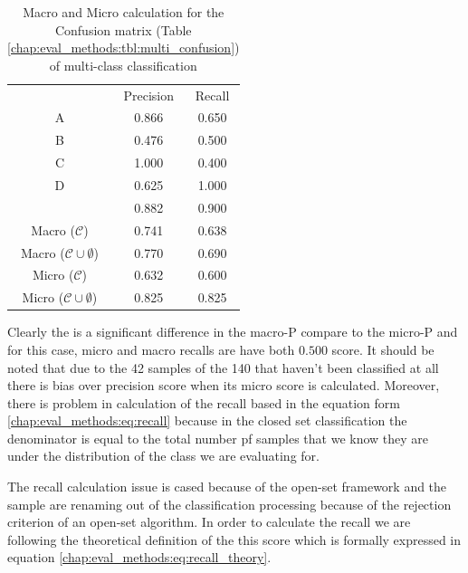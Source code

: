 \begin{table}[H][t]
	\center
	\caption{Macro and Micro calculation for the Confusion matrix (Table \ref{chap:eval_methods:tbl:multi_confusion}) of multi-class classification}\label{chap:eval_methods:tbl:macro_vs_micro}
	\begin{tabular}{l l l}
		\cline{2-3}
		& \multicolumn{1}{|c}{Precision} & \multicolumn{1}{c|}{Recall}\\
		\cline{1-3}
		\multicolumn{1}{|c}{A} & \multicolumn{1}{|c}{0.866} & \multicolumn{1}{c|}{0.650}\\
		\multicolumn{1}{|c}{B} & \multicolumn{1}{|c}{0.476} & \multicolumn{1}{c|}{0.500}\\
		\multicolumn{1}{|c}{C} & \multicolumn{1}{|c}{1.000} & \multicolumn{1}{c|}{0.400}\\
		\multicolumn{1}{|c}{D} & \multicolumn{1}{|c}{0.625} & \multicolumn{1}{c|}{1.000}\\
		\multicolumn{1}{|c}{\emptyset} & \multicolumn{1}{|c}{0.882} & \multicolumn{1}{c|}{0.900}\\
		\cline{1-3}
		\multicolumn{1}{|c}{Macro ($\mathcal{C}$)} & \multicolumn{1}{|c}{0.741} & \multicolumn{1}{c|}{0.638}\\
		\multicolumn{1}{|c}{Macro ($\mathcal{C} \cup \emptyset$)} & \multicolumn{1}{|c}{0.770} & \multicolumn{1}{c|}{0.690}\\
		\multicolumn{1}{|c}{Micro ($\mathcal{C}$)} & \multicolumn{1}{|c}{0.632} & \multicolumn{1}{c|}{0.600}\\
		\multicolumn{1}{|c}{Micro ($\mathcal{C} \cup \emptyset$)} & \multicolumn{1}{|c}{0.825} & \multicolumn{1}{c|}{0.825}\\
		\cline{1-3}
	\end{tabular}
\end{table}


Clearly the is a significant difference in the macro-P compare to the micro-P and for this case, micro and macro recalls are have both $0.500$ score. It should be noted that due to the 42 samples of the 140 that haven't been classified at all there is bias over precision score when its micro score is calculated. Moreover, there is problem in calculation of the recall based in the equation form \ref{chap:eval_methods:eq:recall} because in the closed set classification the denominator is equal to the total number pf samples that we know they are under the distribution of the class we are evaluating for. 

The recall calculation issue is cased because of the open-set framework and the sample are renaming out of the classification processing because of the rejection criterion of an open-set algorithm. In order to calculate the recall we are following the theoretical definition of the this score which is formally expressed in equation \ref{chap:eval_methods:eq:recall_theory}.

